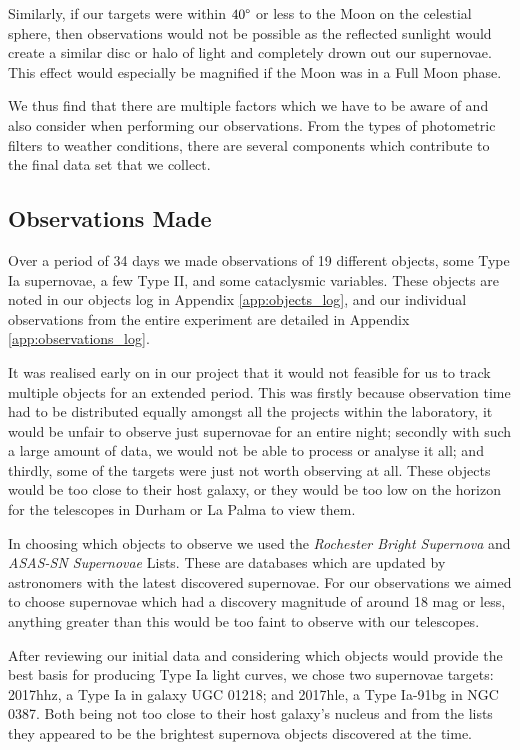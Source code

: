 \documentclass[twocolumn]{revtex4}
\begin{document}
Similarly, if our targets were within $40\degree$ or less to the Moon on the celestial sphere, then observations would not be possible as the reflected sunlight would create a similar disc or halo of light and completely drown out our supernovae. This effect would especially be magnified if the Moon was in a Full Moon phase.

We thus find that there are multiple factors which we have to be aware of and also consider when performing our observations. From the types of photometric filters to weather conditions, there are several components which contribute to the final data set that we collect.

\vspace{-3ex}
\subsection{Observations Made}
\label{observer-observations}
\vspace{-2ex}
Over a period of 34 days we made observations of 19 different objects, some Type Ia supernovae, a few Type II, and some cataclysmic variables. These objects are noted in our objects log in Appendix \ref{app:objects_log}, and our individual observations from the entire experiment are detailed in Appendix \ref{app:observations_log}.

It was realised early on in our project that it would not feasible for us to track multiple objects for an extended period. This was firstly because observation time had to be distributed equally amongst all the projects within the laboratory, it would be unfair to observe just supernovae for an entire night; secondly with such a large amount of data, we would not be able to process or analyse it all; and thirdly, some of the targets were just not worth observing at all. These objects would be too close to their host galaxy, or they would be too low on the horizon for the telescopes in Durham or La Palma to view them.

In choosing which objects to observe we used the \textit{Rochester Bright Supernova} \cite{rochester_sn} and \textit{ASAS-SN Supernovae} \cite{asassn_sn} Lists. These are databases which are updated by astronomers with the latest discovered supernovae. For our observations we aimed to choose supernovae which had a discovery magnitude of around 18 mag or less, anything greater than this would be too faint to observe with our telescopes.

After reviewing our initial data and considering which objects would provide the best basis for producing Type Ia light curves, we chose two supernovae targets: 2017hhz, a Type Ia in galaxy UGC 01218; and 2017hle, a Type Ia-91bg in NGC 0387. Both being not too close to their host galaxy's nucleus and from the lists they appeared to be the brightest supernova objects discovered at the time.
\end{document}
